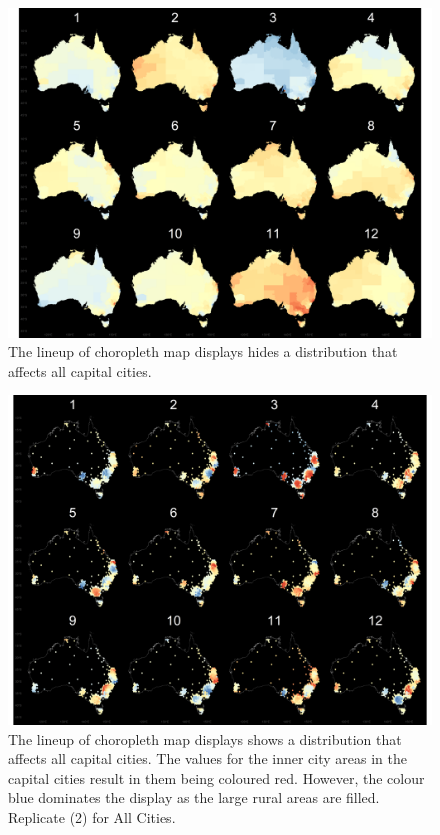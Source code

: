 \documentclass[conference,final,]{IEEEtran}
\makeatletter
\def\maxwidth{\ifdim\Gin@nat@width>\linewidth\linewidth
\else\Gin@nat@width\fi}
\let\Oldincludegraphics\includegraphics
\renewcommand{\includegraphics}[1]{\Oldincludegraphics[width=\maxwidth]{#1}}
\makeatother
\begin{document}
\begin{figure}
\centering
\includegraphics{figures/aus_cities_3_geo.png}
\caption{The lineup of choropleth map displays hides a distribution that
affects all capital cities.}
\end{figure}

\begin{figure}
\centering
\includegraphics{figures/aus_cities_3_hex.png}
\caption{The lineup of choropleth map displays shows a distribution that
affects all capital cities. The values for the inner city areas in the
capital cities result in them being coloured red. However, the colour
blue dominates the display as the large rural areas are filled.
Replicate (2) for All Cities.}
\end{figure}
\end{document}
